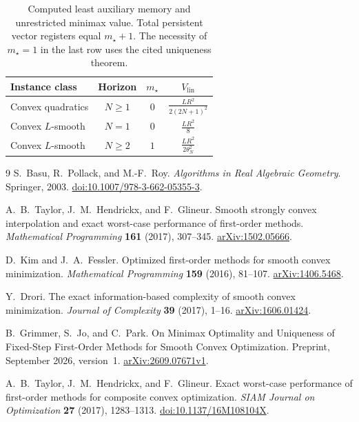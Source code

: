 \documentclass[11pt]{article}
\numberwithin{equation}{section}
\theoremstyle{definition}
\begin{document}
\begin{table}[ht]
\centering
\renewcommand{\arraystretch}{1.45}
\begin{tabular}{@{}lccc@{}}
\toprule
Instance class & Horizon & $m_\star$ & $V_{\mathrm{lin}}$\\
\midrule
Convex quadratics & $N\ge1$ & $0$ & $\displaystyle\frac{LR^2}{2(2N+1)^2}$\\
Convex $L$-smooth & $N=1$ & $0$ & $\displaystyle\frac{LR^2}{8}$\\
Convex $L$-smooth & $N\ge2$ & $1$ & $\displaystyle\frac{LR^2}{2\theta_N^2}$\\
\bottomrule
\end{tabular}
\caption{Computed least auxiliary memory and unrestricted minimax value. Total persistent vector registers equal $m_\star+1$. The necessity of $m_\star=1$ in the last row uses the cited uniqueness theorem.}
\label{tab:results}
\end{table}

\FloatBarrier

\begin{thebibliography}{9}
S.~Basu, R.~Pollack, and M.-F.~Roy.
\emph{Algorithms in Real Algebraic Geometry}.
Springer, 2003.
\href{https://doi.org/10.1007/978-3-662-05355-3}{doi:10.1007/978-3-662-05355-3}.

A.~B.~Taylor, J.~M.~Hendrickx, and F.~Glineur.
Smooth strongly convex interpolation and exact worst-case performance of first-order methods.
\emph{Mathematical Programming} \textbf{161} (2017), 307--345.
\href{https://arxiv.org/abs/1502.05666}{arXiv:1502.05666}.

D.~Kim and J.~A.~Fessler.
Optimized first-order methods for smooth convex minimization.
\emph{Mathematical Programming} \textbf{159} (2016), 81--107.
\href{https://arxiv.org/abs/1406.5468}{arXiv:1406.5468}.

Y.~Drori.
The exact information-based complexity of smooth convex minimization.
\emph{Journal of Complexity} \textbf{39} (2017), 1--16.
\href{https://arxiv.org/abs/1606.01424}{arXiv:1606.01424}.

B.~Grimmer, S.~Jo, and C.~Park.
On Minimax Optimality and Uniqueness of Fixed-Step First-Order Methods for Smooth Convex Optimization.
Preprint, September 2026, version~1.
\href{https://arxiv.org/abs/2609.07671v1}{arXiv:2609.07671v1}.

A.~B.~Taylor, J.~M.~Hendrickx, and F.~Glineur.
Exact worst-case performance of first-order methods for composite convex optimization.
\emph{SIAM Journal on Optimization} \textbf{27} (2017), 1283--1313.
\href{https://doi.org/10.1137/16M108104X}{doi:10.1137/16M108104X}.
\end{thebibliography}
\end{document}
